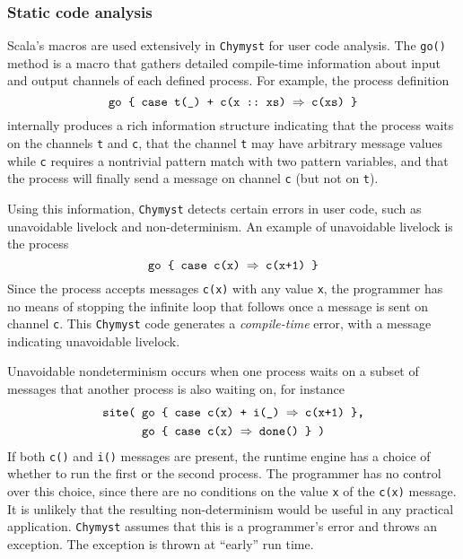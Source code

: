 \documentclass[sigplan,10pt]{acmart}\settopmatter{}
\begin{document}
\subsubsection{Static code analysis}

Scala's macros are used extensively in \texttt{Chymyst} for user code
analysis. The \texttt{go()} method is a macro that gathers detailed
compile-time information about input and output channels of each defined
process. For example, the process definition
\[
\text{\texttt{go \{ case t(\_) + c(x ::~xs) \ensuremath{\Rightarrow} c(xs) \}}}
\]
internally produces a rich information structure indicating that the
process waits on the channels \texttt{t} and \texttt{c}, that the
channel \texttt{t} may have arbitrary message values while \texttt{c}
requires a nontrivial pattern match with two pattern variables, and
that the process will finally send a message on channel \texttt{c}
(but not on \texttt{t}).

Using this information, \texttt{Chymyst} detects certain errors in
user code, such as unavoidable livelock and non-determinism. An example
of unavoidable livelock is the process
\[
\text{\texttt{go \{ case c(x) \ensuremath{\Rightarrow} c(x+1) \}}}
\]
Since the process accepts messages \texttt{c(x)} with any value \texttt{x},
the programmer has no means of stopping the infinite loop that follows
once a message is sent on channel \texttt{c}. This \texttt{Chymyst}
code generates a \emph{compile-time} error, with a message indicating
unavoidable livelock.

\begin{comment}
Deadlocks can only happen when using synchronous channels and are
harder to detect reliably. A deadlock warning is given when the process
sends a synchronous message followed by another message that is consumed
together with the synchronous one:
\[
\text{\texttt{go \{ case a(\_) + c(x) + f(\_, r) \ensuremath{\Rightarrow} c(f() + 1); r(x) \}}}
\]
This code is suspicious because the process waits for a reply to \texttt{f()}
and \emph{then} sends \texttt{c()}, while a reply to \texttt{f()}
happens only \emph{after} both \texttt{f()} and \texttt{c()} are sent.
\end{comment}

Unavoidable nondeterminism occurs when one process waits on a subset
of messages that another process is also waiting on, for instance
\begin{align*}
\text{\texttt{site( }} & \text{\texttt{go \{ case c(x) + i(\_) \ensuremath{\Rightarrow} c(x+1) \},}}\\
 & \text{\text{\texttt{go \{ case c(x) }}\texttt{\ensuremath{\Rightarrow} done() \} )}}
\end{align*}
If both \texttt{c()} and \texttt{i()} messages are present, the runtime
engine has a choice of whether to run the first or the second process.
The programmer has no control over this choice, since there are no
conditions on the value \texttt{x} of the \texttt{c(x)} message. It
is unlikely that the resulting non-determinism would be useful in
any practical application. \texttt{Chymyst} assumes that this is a
programmer's error and throws an exception. The exception is thrown
at ``early'' run time.
\end{document}
